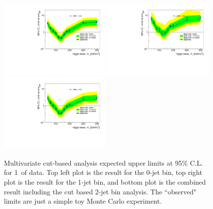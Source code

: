 \begin{figure}[!htbp]
\begin{center}
   \includegraphics[width=0.49\textwidth]{figures/limits_0j_1000pb_mva_1.pdf}
   \includegraphics[width=0.49\textwidth]{figures/limits_1j_1000pb_mva_1.pdf}
   \includegraphics[width=0.49\textwidth]{figures/limits_nj_1000pb_mva_1.pdf}
   \caption{Multivariate cut-based analysis expected upper limits at 95\% C.L. for 1\ifb\ of data. Top left plot 
   is the result for the 0-jet bin, top right plot is the result for the 1-jet bin, and 
   bottom plot is the combined result including the cut based 2-jet bin analysis. The ``observed" limits 
   are just a simple toy Monte Carlo experiment.}
   \label{fig:mvabase_uls}
\end{center}
\end{figure}

